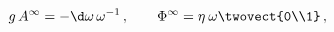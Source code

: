 \begin{equation}
g\, A^\infty = -  \d \omega\, \omega^{-1}\,, \qquad
\Phi^\infty = \eta \: \omega \twovect{0\\1}\,,
\end{equation}

